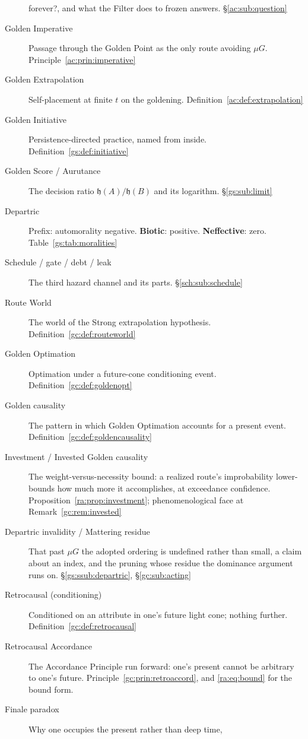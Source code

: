 \documentclass[11pt]{article}
\numberwithin{equation}{section}
\theoremstyle{plain}
\theoremstyle{definition}
\theoremstyle{remark}
\newcommand{\hm}{\mathfrak{h}}
\begin{document}
\begin{description}
{forever?}, and what the Filter does to frozen answers.
\S\ref{ac:sub:question}
\item[Golden Imperative] Passage through the Golden Point as the only
route avoiding $\mu G$. Principle~\ref{ac:prin:imperative}
\item[Golden Extrapolation] Self-placement at finite $t$ on the
goldening. Definition~\ref{ac:def:extrapolation}
\item[Golden Initiative] Persistence-directed practice, named from
inside. Definition~\ref{gs:def:initiative}
\item[Golden Score / Aurutance] The decision ratio $\hm(A)/\hm(B)$ and
its logarithm. \S\ref{gs:sub:limit}
\item[Departric] Prefix: automorality negative. \textbf{Biotic}:
positive. \textbf{Neffective}: zero. Table~\ref{gs:tab:moralities}
\item[Schedule / gate / debt / leak] The third hazard channel and its
parts. \S\ref{sch:sub:schedule}
\item[Route World] The world of the Strong extrapolation hypothesis.
Definition~\ref{gc:def:routeworld}
\item[Golden Optimation] Optimation under a future-cone conditioning
event. Definition~\ref{gc:def:goldenopt}
\item[Golden causality] The pattern in which Golden Optimation accounts
for a present event. Definition~\ref{gc:def:goldencausality}
\item[Investment / Invested Golden causality] The weight-versus-necessity
bound: a realized route's improbability lower-bounds how much more it
accomplishes, at exceedance confidence. Proposition~\ref{ra:prop:investment};
phenomenological face at Remark~\ref{gc:rem:invested}
\item[Departric invalidity / Mattering residue] That past $\mu G$ the
adopted ordering is undefined rather than small, a claim about an
index, and the pruning whose residue the dominance argument runs on.
\S\ref{gs:ssub:departric}, \S\ref{gc:sub:acting}
\item[Retrocausal (conditioning)] Conditioned on an attribute in one's
future light cone; nothing further. Definition~\ref{gc:def:retrocausal}
\item[Retrocausal Accordance] The Accordance Principle run forward: one's
present cannot be arbitrary to one's future.
Principle~\ref{gc:prin:retroaccord}, and \eqref{ra:eq:bound} for the
bound form.
\item[Finale paradox] Why one occupies the present rather than deep time,

\end{description}
\end{document}
